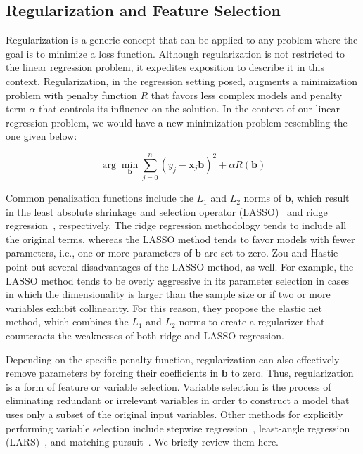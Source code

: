 \subsection{Regularization and Feature Selection}
\label{sec:regularization}
Regularization is a generic concept that can be applied to any problem where the goal is to minimize a loss function.
%
Although regularization is not restricted to the linear regression problem, it expedites exposition to describe it in this context.
%
Regularization, in the regression setting posed, augments a minimization problem with penalty function $R$ that favors less complex models and penalty term $\alpha$ that controls its influence on the solution.
%
In the context of our linear regression problem, we would have a new minimization problem resembling the one given below:

\begin{equation}
\arg\min_{\mathbf{b}} \sum_{j=0}^n(y_j - \mathbf{x}_j\mathbf{b})^2 + \alpha R(\mathbf{b})
\label{eq:genericRegularization}
\end{equation}

Common penalization functions include the $L_1$ and $L_2$ norms of $\mathbf{b}$, which result in the least absolute shrinkage and selection operator (LASSO)~\cite{Tibshirani1996} and ridge regression~\cite{Hoerl1959,Hoerl1962}, respectively.
%
The ridge regression methodology tends to include all the original terms, whereas the LASSO method tends to favor models with fewer parameters, i.e., one or more parameters of $\mathbf{b}$ are set to zero.
%
Zou and Hastie~\cite{ZouHastie2005} point out several disadvantages of the LASSO method, as well.
%
For example, the LASSO method tends to be overly aggressive in its parameter selection in cases in which the dimensionality is larger than the sample size or if two or more variables exhibit collinearity.
%
For this reason, they propose the elastic net method, which combines the $L_1$ and $L_2$ norms to create a regularizer that counteracts the weaknesses of both ridge and LASSO regression.

Depending on the specific penalty function, regularization can also effectively remove parameters by forcing their coefficients in $\mathbf{b}$ to zero.
%
Thus, regularization is a form of feature or variable selection.
%
Variable selection is the process of eliminating redundant or irrelevant variables in order to construct a model that uses only a subset of the original input variables.
%
Other methods for explicitly performing variable selection include stepwise regression~\cite{DraperSmith2014}, least-angle regression (LARS)~\cite{EfronHastieJohnstone2004}, and matching pursuit~\cite{MallatZhang1993,DavisMallatZhang1994,PatiRezaiifarKrishnaprasad1993}.
%
We briefly review them here.

